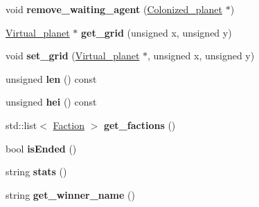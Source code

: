 \begin{DoxyCompactItemize}
\item 
\hypertarget{classWorld_a5abd90500d2a6e70ef6d21dbc02cb440}{void {\bfseries remove\-\_\-waiting\-\_\-agent} (\hyperlink{classColonized__planet}{Colonized\-\_\-planet} $\ast$)}\label{classWorld_a5abd90500d2a6e70ef6d21dbc02cb440}

\item 
\hypertarget{classWorld_a6c5e27cae9fd6a526da0f4c58b320733}{\hyperlink{classVirtual__planet}{Virtual\-\_\-planet} $\ast$ {\bfseries get\-\_\-grid} (unsigned x, unsigned y)}\label{classWorld_a6c5e27cae9fd6a526da0f4c58b320733}

\item 
\hypertarget{classWorld_a593960e61c13083719721b0c289dad94}{void {\bfseries set\-\_\-grid} (\hyperlink{classVirtual__planet}{Virtual\-\_\-planet} $\ast$, unsigned x, unsigned y)}\label{classWorld_a593960e61c13083719721b0c289dad94}

\item 
\hypertarget{classWorld_a9263bc299d1446cc7435c58fc70dbc12}{unsigned {\bfseries len} () const }\label{classWorld_a9263bc299d1446cc7435c58fc70dbc12}

\item 
\hypertarget{classWorld_abb70914eb0c8c9a083372c679b512a84}{unsigned {\bfseries hei} () const }\label{classWorld_abb70914eb0c8c9a083372c679b512a84}

\item 
\hypertarget{classWorld_afcbc72644f2fc56f223c9bb80b50474a}{std\-::list$<$ \hyperlink{classFaction}{Faction} $>$ {\bfseries get\-\_\-factions} ()}\label{classWorld_afcbc72644f2fc56f223c9bb80b50474a}

\item 
\hypertarget{classWorld_ae8473fc069907cd6cc96d32c49b62d7e}{bool {\bfseries is\-Ended} ()}\label{classWorld_ae8473fc069907cd6cc96d32c49b62d7e}

\item 
\hypertarget{classWorld_a2ae945389cb96c6a10dcc07a45a2cefd}{string {\bfseries stats} ()}\label{classWorld_a2ae945389cb96c6a10dcc07a45a2cefd}

\item 
\hypertarget{classWorld_aaa59a538a6b688f164707743faf63072}{string {\bfseries get\-\_\-winner\-\_\-name} ()}\label{classWorld_aaa59a538a6b688f164707743faf63072}

\end{DoxyCompactItemize}
